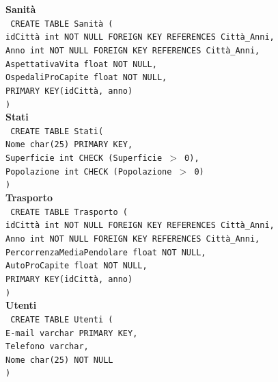 \documentclass[a4paper,12pt]{report}
\begin{document}
                \noindent
                {\large \textbf{Sanità}} \\
                \texttt{
                    CREATE TABLE Sanità ( \\
                    \null\quad\quad idCittà int NOT NULL FOREIGN KEY REFERENCES Città\_Anni, \\
                    \null\quad\quad Anno int NOT NULL FOREIGN KEY REFERENCES Città\_Anni, \\
                    \null\quad\quad AspettativaVita float NOT NULL, \\
                    \null\quad\quad OspedaliProCapite float NOT NULL, \\
                    \null\quad\quad PRIMARY KEY(idCittà, anno) \\
                    )
                } \\
                \noindent
                {\large \textbf{Stati}} \\
                \texttt{
                    CREATE TABLE Stati( \\
                    \null\quad\quad Nome            char(25)        PRIMARY KEY, \\
                    \null\quad\quad Superficie      int             CHECK (Superficie $>$ 0), \\
                    \null\quad\quad Popolazione     int             CHECK (Popolazione $>$ 0) \\
                    )   
                } \\
                \noindent
                {\large \textbf{Trasporto}} \\
                \texttt{
                    CREATE TABLE Trasporto ( \\
                    \null\quad\quad idCittà int NOT NULL FOREIGN KEY REFERENCES Città\_Anni, \\
                    \null\quad\quad Anno int NOT NULL FOREIGN KEY REFERENCES Città\_Anni, \\
                    \null\quad\quad PercorrenzaMediaPendolare float NOT NULL, \\
                    \null\quad\quad AutoProCapite float NOT NULL, \\
                    \null\quad\quad PRIMARY KEY(idCittà, anno) \\
                    )
                } \\

                \noindent
                {\large \textbf{Utenti}} \\
                \texttt{
                    CREATE TABLE Utenti ( \\
                    \null\quad\quad E-mail varchar PRIMARY KEY, \\
                    \null\quad\quad Telefono varchar, \\
                    \null\quad\quad Nome char(25) NOT NULL \\
                    )
                } \\
\end{document}
